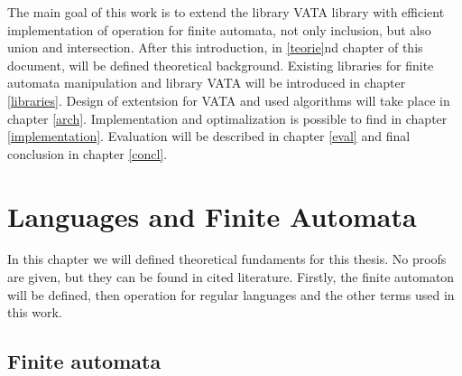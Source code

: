 \begin{comment}
Finite automata recognize exactly set of regular languages \cite{ullman}.
In formal verification are often problems described as language inclusion \cite{antichain}. Finite automata used for this purposes 
can have very large amount of states, so operations on them could be very computationally demanding.
This fact leads to need of efficient implementation of algorithms for inclusion checking and the other operations on finite automata.

New algorithms for checking language inclusion were introduced \cite{antichain}, \cite{congr}, 
but still not efficiently implemented for finite automata in laguage such as C++. These algorithms are based on pruning out the states, that aren't
unnecessary for checking inclusion, so computation isn't so expensive. Algorithms with optimalization based on antichains and simulation from \cite{antichain}
are implemented in C++ library VATA \cite{libvata}, but only for tree automata. It's possible to use these algorithms for finite automata, which can be represented 
like one dimensional tree automata, but special implementation of algorithms for finite automata will be more efficient. %
\end{comment}

The main goal of this work is to extend the library VATA library with efficient implementation of operation for finite automata, not only inclusion, but
also union and intersection. After this introduction, in \ref{teorie}nd chapter of this document, 
will be defined theoretical background. Existing libraries for finite automata manipulation and library VATA will be introduced in chapter \ref{libraries}. 
Design of extentsion for VATA and used algorithms
will take place in chapter \ref{arch}. Implementation and optimalization is possible to find in chapter \ref{implementation}. Evaluation will be
described in chapter \ref{eval} and final conclusion in chapter \ref{concl}.
\chapter{Languages and Finite Automata}
In this chapter we will defined theoretical fundaments for this thesis. No proofs are given, but they can be found in cited literature. 
Firstly, the finite automaton will be defined, then operation for regular languages and the other terms used in this work.
\label{teorie}
\section{Finite automata}
\label{defFA}

